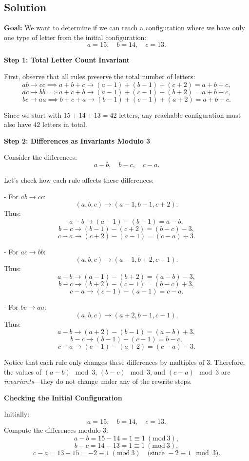 \documentclass{article}
\theoremstyle{theorem}
\theoremstyle{definition}
\theoremstyle{remark}
\begin{document}
\subsection*{Solution}

\textbf{Goal:} We want to determine if we can reach a configuration where we have only one type of letter from the initial configuration:  
\[
a = 15, \quad b = 14, \quad c = 13.
\]

\textbf{Step 1: Total Letter Count Invariant}

First, observe that all rules preserve the total number of letters:
\[
ab \to cc \implies a+b+c \to (a-1)+(b-1)+(c+2) = a+b+c,
\]
\[
ac \to bb \implies a+c+b \to (a-1)+(c-1)+(b+2) = a+b+c,
\]
\[
bc \to aa \implies b+c+a \to (b-1)+(c-1)+(a+2) = a+b+c.
\]

Since we start with \(15+14+13=42\) letters, any reachable configuration must also have \(42\) letters in total.

\textbf{Step 2: Differences as Invariants Modulo 3}

Consider the differences:
\[
a - b, \quad b - c, \quad c - a.
\]

Let’s check how each rule affects these differences:

- For \(ab \to cc\):  
  \[
  (a,b,c) \to (a-1,b-1,c+2).
  \]  
  Thus:
  \[
  a-b \to (a-1)-(b-1) = a-b,
  \]
  \[
  b-c \to (b-1)-(c+2) = (b-c)-3,
  \]
  \[
  c-a \to (c+2)-(a-1) = (c-a)+3.
  \]

- For \(ac \to bb\):  
  \[
  (a,b,c) \to (a-1,b+2,c-1).
  \]  
  Thus:
  \[
  a-b \to (a-1)-(b+2) = (a-b)-3,
  \]
  \[
  b-c \to (b+2)-(c-1) = (b-c)+3,
  \]
  \[
  c-a \to (c-1)-(a-1) = c-a.
  \]

- For \(bc \to aa\):  
  \[
  (a,b,c) \to (a+2,b-1,c-1).
  \]  
  Thus:
  \[
  a-b \to (a+2)-(b-1) = (a-b)+3,
  \]
  \[
  b-c \to (b-1)-(c-1) = b-c,
  \]
  \[
  c-a \to (c-1)-(a+2) = (c-a)-3.
  \]

Notice that each rule only changes these differences by multiples of 3. Therefore, the values of \((a-b) \mod 3\), \((b-c) \mod 3\), and \((c-a) \mod 3\) are \emph{invariants}—they do not change under any of the rewrite steps.

\textbf{Checking the Initial Configuration}

Initially:
\[
a=15, \quad b=14, \quad c=13.
\]
Compute the differences modulo 3:
\[
a-b = 15-14 = 1 \equiv 1 \ (\mathrm{mod}\ 3),
\]
\[
b-c = 14-13 = 1 \equiv 1 \ (\mathrm{mod}\ 3),
\]
\[
c-a = 13-15 = -2 \equiv 1 \ (\mathrm{mod}\ 3) \quad \text{(since } -2 \equiv 1 \mod 3\text{)}.
\]
\end{document}
